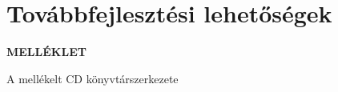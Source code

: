 \documentclass[a4paper,oneside,10pt]{report}
\begin{document}
\chapter{Továbbfejlesztési lehetőségek}
\label{tovabbfejl}














\newpage

\Large
\begin{center}
	\textbf{MELLÉKLET}
\end{center}
\normalsize
\noindent
A mellékelt CD könyvtárszerkezete
\end{document}
